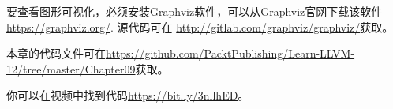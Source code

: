 要查看图形可视化，必须安装Graphviz软件，可以从Graphviz官网下载该软件\url{https://graphviz.org/}. 源代码可在 \url{http://gitlab.com/graphviz/graphviz/}获取。\par

本章的代码文件可在\url{https://github.com/PacktPublishing/Learn-LLVM-12/tree/master/Chapter09}获取。\par

你可以在视频中找到代码\url{https://bit.ly/3nllhED}。\par